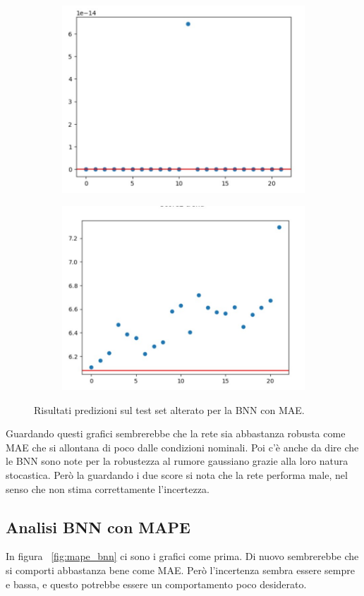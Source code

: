 \documentclass[
	letterpaper,
	a4paper,
	cleardoublepage=empty,
	headings=twolinechapter,
	numbers=autoenddot,
]{article}
\begin{document}
\begin{figure}[h]
		\begin{subfigure}{.5\textwidth}
			\centering
			\includegraphics[width=0.7\linewidth]{ImageFiles/mae_bnn_ci}
			\caption{}
				\label{fig:mae_bnn_ci}
		\end{subfigure}%
		\begin{subfigure}{.5\textwidth}
			\centering
			\includegraphics[width=0.7\linewidth]{ImageFiles/mae_bnn_eff2}
			\caption{}
			\label{fig:mae_bnn_eff2}
		\end{subfigure}
		\caption{Risultati predizioni sul test set alterato per la BNN con MAE.}
		\label{fig:mae_bnn}
	\end{figure}

	Guardando questi grafici sembrerebbe che la rete sia abbastanza robusta come MAE che si allontana di poco dalle condizioni nominali. Poi c'è anche da dire che le BNN sono note per la robustezza al rumore gaussiano grazie alla loro natura stocastica.
	Però la guardando i due score si nota che la rete performa male, nel senso che non stima correttamente l'incertezza.
	
	\subsection{Analisi BNN con MAPE}
	In figura ~\ref{fig:mape_bnn} ci sono i grafici come prima. Di nuovo sembrerebbe che si comporti abbastanza bene come MAE. Però l'incertenza sembra essere sempre e bassa, e questo potrebbe essere un comportamento poco desiderato.
	
\end{document}
